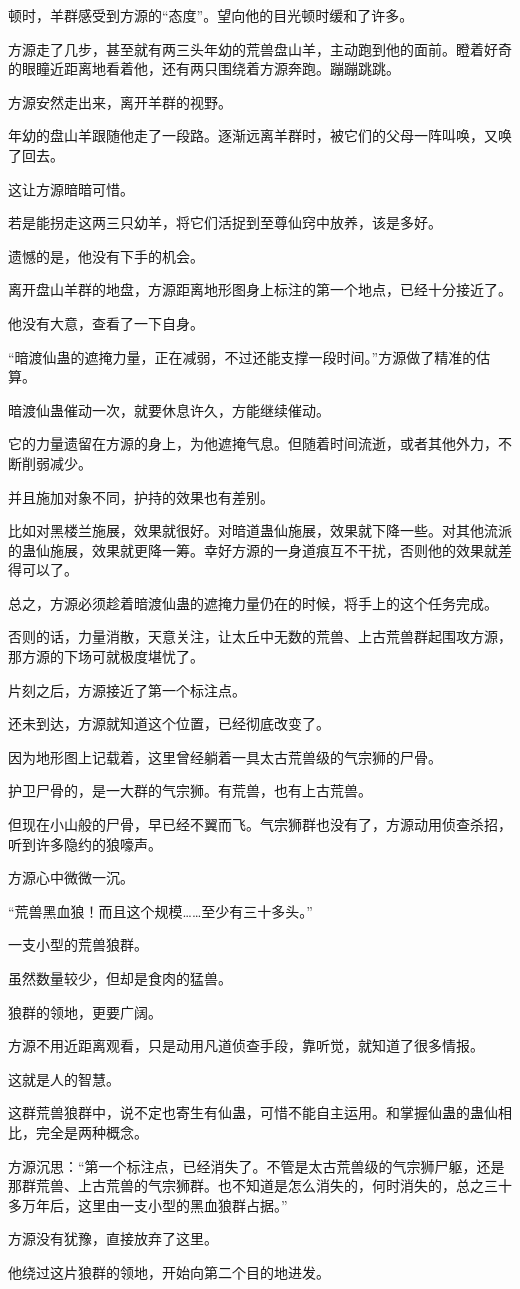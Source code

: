 \begin{this_body}
顿时，羊群感受到方源的“态度”。望向他的目光顿时缓和了许多。

方源走了几步，甚至就有两三头年幼的荒兽盘山羊，主动跑到他的面前。瞪着好奇的眼瞳近距离地看着他，还有两只围绕着方源奔跑。蹦蹦跳跳。

方源安然走出来，离开羊群的视野。

年幼的盘山羊跟随他走了一段路。逐渐远离羊群时，被它们的父母一阵叫唤，又唤了回去。

这让方源暗暗可惜。

若是能拐走这两三只幼羊，将它们活捉到至尊仙窍中放养，该是多好。

遗憾的是，他没有下手的机会。

离开盘山羊群的地盘，方源距离地形图身上标注的第一个地点，已经十分接近了。

他没有大意，查看了一下自身。

“暗渡仙蛊的遮掩力量，正在减弱，不过还能支撑一段时间。”方源做了精准的估算。

暗渡仙蛊催动一次，就要休息许久，方能继续催动。

它的力量遗留在方源的身上，为他遮掩气息。但随着时间流逝，或者其他外力，不断削弱减少。

并且施加对象不同，护持的效果也有差别。

比如对黑楼兰施展，效果就很好。对暗道蛊仙施展，效果就下降一些。对其他流派的蛊仙施展，效果就更降一筹。幸好方源的一身道痕互不干扰，否则他的效果就差得可以了。

总之，方源必须趁着暗渡仙蛊的遮掩力量仍在的时候，将手上的这个任务完成。

否则的话，力量消散，天意关注，让太丘中无数的荒兽、上古荒兽群起围攻方源，那方源的下场可就极度堪忧了。

片刻之后，方源接近了第一个标注点。

还未到达，方源就知道这个位置，已经彻底改变了。

因为地形图上记载着，这里曾经躺着一具太古荒兽级的气宗狮的尸骨。

护卫尸骨的，是一大群的气宗狮。有荒兽，也有上古荒兽。

但现在小山般的尸骨，早已经不翼而飞。气宗狮群也没有了，方源动用侦查杀招，听到许多隐约的狼嚎声。

方源心中微微一沉。

“荒兽黑血狼！而且这个规模……至少有三十多头。”

一支小型的荒兽狼群。

虽然数量较少，但却是食肉的猛兽。

狼群的领地，更要广阔。

方源不用近距离观看，只是动用凡道侦查手段，靠听觉，就知道了很多情报。

这就是人的智慧。

这群荒兽狼群中，说不定也寄生有仙蛊，可惜不能自主运用。和掌握仙蛊的蛊仙相比，完全是两种概念。

方源沉思：“第一个标注点，已经消失了。不管是太古荒兽级的气宗狮尸躯，还是那群荒兽、上古荒兽的气宗狮群。也不知道是怎么消失的，何时消失的，总之三十多万年后，这里由一支小型的黑血狼群占据。”

方源没有犹豫，直接放弃了这里。

他绕过这片狼群的领地，开始向第二个目的地进发。

\end{this_body}

